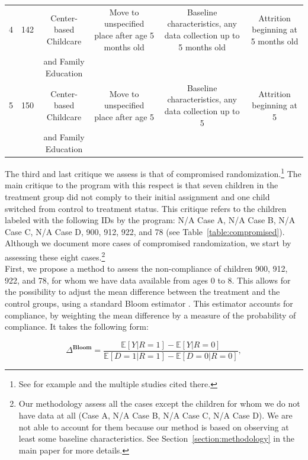 \begin{appendices}
\begin{table}
\begin{threeparttable}
\begin{tabular}{cccccc}
4 & 142 & Center-based Childcare & Move to unspecified place after age 5 months old & Baseline characteristics, any data collection up to 5 months old & Attrition beginning at 5 months old \\
 &  & and Family Education &  &  & \\
5 & 150 & Center-based Childcare & Move to unspecified place after age 5 & Baseline characteristics, any data collection up to 5 & Attrition beginning at 5 \\
 &  & and Family Education &  &  & \\ \hline \hline 
\end{tabular}
\end{threeparttable}
\end{table}

\restoregeometry

\noindent The third and last critique we assess is that of compromised randomization.\footnote{See for example \citet{Baumeister-Bacharach_2000_Early-Generic} and the multiple studies cited there.} The main critique to the program with this respect is that seven children in the treatment group did not comply to their initial assignment and one child switched from control to treatment status. This critique refers to the children labeled with the following IDs by the program: N/A Case A, N/A Case B, N/A Case C, N/A Case D, 900, 912, 922, and 78 (see Table~\ref{table:compromised}). Although we document more cases of compromised randomization, we start by assessing these eight cases.\footnote{Our methodology assess all the cases except the children for whom we do not have data at all (Case A, N/A Case B, N/A Case C, N/A Case D). We are not able to account for them because our method is based on observing at least some baseline characteristics. See Section~\ref{section:methodology} in the main paper for more details.}\\

\noindent First, we propose a method to assess the non-compliance of children 900, 912, 922, and 78, for whom we have data available from ages 0 to 8. This allows for the possibility to adjust the mean difference between the treatment and the control groups, using a standard Bloom estimator \citep{Bloom_1984_ER}. This estimator accounts for compliance, by weighting the mean difference by a measure of the probability of compliance. It takes the following form: 

\begin{equation}
\Delta^{\textbf{Bloom}} = \frac{\mathbb{E} \left[ Y | R = 1 \right] - \mathbb{E} \left[ Y | R = 0 \right] }{\mathbb{E} \left[ D = 1 | R = 1 \right] - \mathbb{E} \left[ D = 0 | R = 0 \right]}, 
\end{equation}


\end{appendices}
